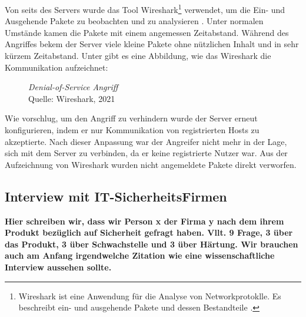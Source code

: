 Von seits des Servers wurde das Tool Wireshark\footnote{Wireshark ist eine Anwendung für die Analyse von Networkprotoklle.
Es beschreibt ein- und ausgehende Pakete und dessen Bestandteile \cite{refst:wisa}.} verwendet, um die Ein- und Ausgehende
Pakete zu beobachten und zu analysieren \cite{refart:UBEC}. Unter normalen Umstände kamen die Pakete mit einem angemessen
Zeitabstand. Während des Angriffes bekem der Server viele kleine Pakete ohne nützlichen Inhalt und in sehr kürzem Zeitabstand.
Unter gibt es eine Abbildung, wie das Wireshark die Kommunikation aufzeichnet:

\begin{figure}[H]
  \caption{\textit{Denial-of-Service Angriff}\\Quelle: Wireshark, 2021}
  \label{fig:refst_wisa}
\end{figure}

Wie \cite{refip:NYRS} vorschlug, um den Angriff zu verhindern wurde der Server erneut konfigurieren, indem er nur
Kommunikation von registrierten Hosts zu akzeptierte. Nach dieser Anpassung war der Angreifer nicht mehr in der Lage, 
sich mit dem Server zu verbinden, da er keine registrierte Nutzer war. Aus der Aufzeichnung von Wireshark wurden nicht 
angemeldete Pakete direkt verworfen.

\subsection{Interview mit IT-SicherheitsFirmen}

\textbf{Hier schreiben wir, dass wir Person x der Firma y nach dem ihrem Produkt bezüglich auf Sicherheit gefragt haben.
Vllt. 9 Frage, 3 über das Produkt, 3 über Schwachstelle und 3 über Härtung. Wir brauchen auch am Anfang irgendwelche Zitation
wie eine wissenschaftliche Interview aussehen sollte.}

